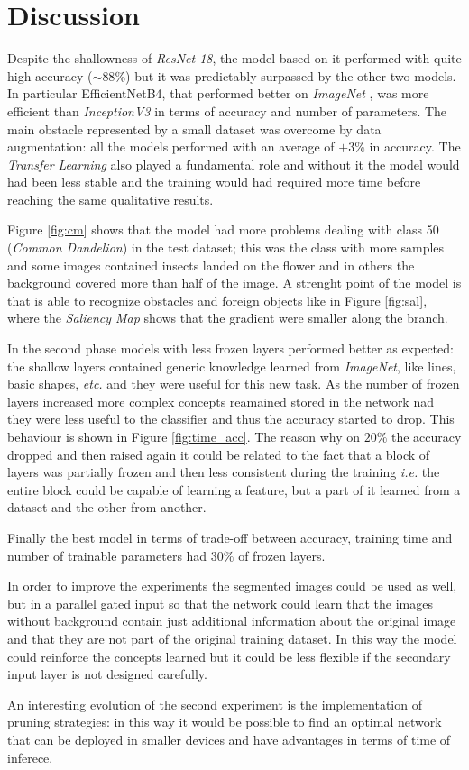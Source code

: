 \section{Discussion}
Despite the shallowness of \textit{ResNet-18}, the model based on it performed with quite high accuracy ($\sim 88\%$) but it was predictably surpassed by the other two models. In particular EfficientNetB4, that performed better on \textit{ImageNet} \cite{tan2019efficientnet}, was more efficient than \textit{InceptionV3} in terms of accuracy and number of parameters. The main obstacle represented by a small dataset was overcome by data augmentation: all the models performed with an average of $+3\%$ in accuracy. The \textit{Transfer Learning} also played a fundamental role and  without it the model would had been less stable and the training would had required more time before reaching the same qualitative results.\par
Figure \ref{fig:cm} shows that the model had more problems dealing with class 50 (\textit{Common Dandelion}) in the test dataset; this was the class with more samples and some images contained insects landed on the flower and in others the background covered more than half of the image. A strenght point of the model is that is able to recognize obstacles and foreign objects like in Figure \ref{fig:sal}, where the \textit{Saliency Map} shows that the gradient were smaller along the branch.
\par
In the second phase models with less frozen layers performed better as expected: the shallow layers contained generic knowledge learned from \textit{ImageNet}, like lines, basic shapes, \textit{etc.} and they were useful for this new task. As the number of frozen layers increased more complex concepts reamained stored in the network nad they were less useful to the classifier
and thus the accuracy started to drop. This behaviour is shown in Figure \ref{fig:time_acc}. The reason why on $20\%$ the accuracy dropped and then raised again it could be related to the fact that a block of layers was partially frozen and then less consistent during the training \textit{i.e.} the entire block could be capable of learning a feature, but a part of it learned from a dataset and the other from another.
\par Finally the best model in terms of trade-off between accuracy, training time and number of trainable parameters had $30\%$ of frozen layers.\par


In order to improve the experiments the segmented images could be used as well, but in a parallel gated input so that the network could learn that the images without background contain just additional information about the original image and that they are not part of the original training dataset. In this way the model could reinforce the concepts learned but it could be less flexible if the secondary input layer is not designed carefully. \par
An interesting evolution of the second experiment is the implementation of pruning strategies: in this way it would be possible to find an optimal network that can be deployed in smaller devices and have advantages in terms of time of inferece.



